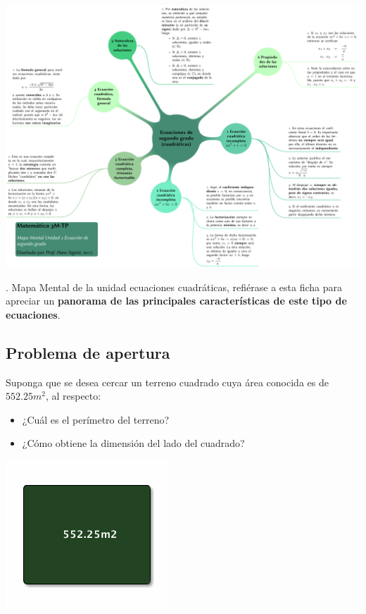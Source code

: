 \documentclass[12pt,letterpaper,article,x11names]{memoir}
\begin{document}
\begin{enumerate}
{\begin{center}
\includegraphics[width=.9\linewidth]{Mapa_Mental_Unidad2_Ecuaciones_Cuadraticas.pdf}
\end{center}}. Mapa Mental de la unidad ecuaciones cuadráticas, refiérase a esta ficha para apreciar un \textbf{panorama de las principales características de este tipo de ecuaciones}.
\end{enumerate}

\subsection{Problema de apertura}
\label{sec:org668258f}
Suponga que se desea cercar un terreno cuadrado cuya área conocida es de \(552.25m^2\), al respecto:

\begin{itemize}
\item ¿Cuál es el perímetro del terreno?
\item ¿Cómo obtiene la dimensión del lado del cuadrado?
\end{itemize}

\begin{center}
\includegraphics[width=.9\linewidth]{apertura.png}
\end{center}
\end{document}
